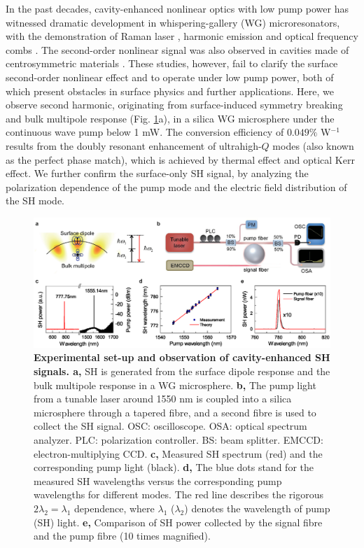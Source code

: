 \documentclass[a4paper,8pt,hyperref, twocolumn, aps, prl]{article}
\begin{document}
In the past decades, cavity-enhanced nonlinear optics with low pump power has witnessed dramatic development in whispering-gallery (WG) microresonators, with the demonstration of Raman laser \cite{spillane2002ultralow}, harmonic emission \cite{ilchenko2004nonlinear, carmon2007visible, furst2010naturally} and optical frequency combs \cite{del2007optical}.
The second-order nonlinear signal was also observed
in cavities made of centrosymmetric materials \cite{gouveia2013second, lettieri2002second, lettieri2005second, levy2011harmonic, asano2016visible, xue2017second}.
These studies, however, fail to clarify the surface second-order nonlinear effect and to operate under low pump power, both of which present obstacles in surface physics and further applications.
Here, we observe second harmonic, originating from surface-induced symmetry breaking and bulk multipole response (Fig. \ref{pic:Fig1}a), in a silica WG microsphere under the continuous wave pump below 1 mW.
The conversion efficiency of $0.049\%$ W$^{-1}$ results from the doubly resonant enhancement of ultrahigh-$Q$ modes (also known as the perfect phase match), which is achieved by thermal effect and optical Kerr effect.
We further confirm the surface-only SH signal, by analyzing the polarization dependence of the pump mode and the electric field distribution of the SH mode.

\begin{figure}[!ht]
\centering
\includegraphics[width=18cm]{Fig1.eps}
\caption{\textbf{Experimental set-up and observation of cavity-enhanced SH signals. a, }SH is generated from the surface dipole response and the bulk multipole response in a WG microsphere. \textbf{b, }The pump light from a tunable laser around 1550 nm is coupled into a silica microsphere through a tapered fibre, and a second fibre is used to collect the SH signal. OSC: oscilloscope. OSA: optical spectrum analyzer. PLC: polarization controller. BS: beam splitter. EMCCD: electron-multiplying CCD. \textbf{c, }Measured SH spectrum (red) and the corresponding pump light (black). \textbf{d, } The blue dots stand for the measured SH wavelengths versus the corresponding pump wavelengths for different modes. The red line describes the rigorous $2\lambda_2 = \lambda_1$ dependence, where $\lambda_1$ ($\lambda_2$) denotes the wavelength of pump (SH) light.
\textbf{e, }Comparison of SH power collected by the signal fibre and the pump fibre (10 times magnified).}
\label{pic:Fig1}
\end{figure}
\end{document}

